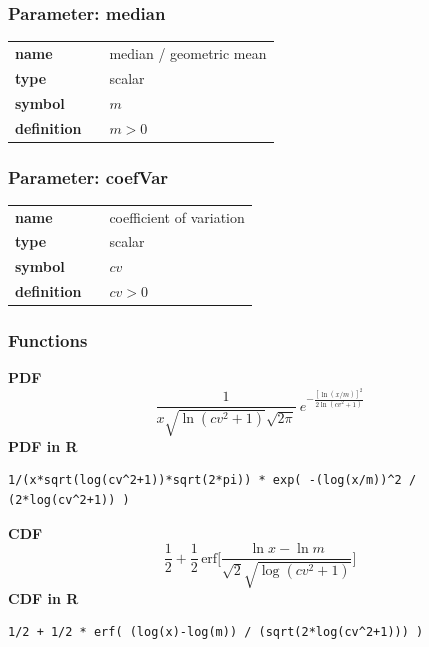 \subsubsection*{Parameter: median}

\noindent\begin{tabular}{p{2cm}cl}
\textbf{name} & & median / geometric mean \\
\textbf{type} & & scalar \\
\textbf{symbol} & & $m$  \\
\textbf{definition} & & $m>0$
\end{tabular}
\subsubsection*{Parameter: coefVar}

\noindent\begin{tabular}{p{2cm}cl}
\textbf{name} & & coefficient of variation \\
\textbf{type} & & scalar \\
\textbf{symbol} & & $cv$  \\
\textbf{definition} & & $cv>0$
\end{tabular}
\subsubsection*{Functions}

\smallskip \noindent \hspace{.2cm} \textbf{PDF} 
\begin{equation*}\frac{1}{x\sqrt{\ln(cv^2+1)}\sqrt{2\pi}}\ e^{-\frac{\left[\ln (x/m)\right]^2}{2\ln(cv^2+1)}}\end{equation*}
\smallskip \noindent \hspace{.2cm} \textbf{PDF in R}  
\begin{verbatim}1/(x*sqrt(log(cv^2+1))*sqrt(2*pi)) * exp( -(log(x/m))^2 / (2*log(cv^2+1)) )\end{verbatim}
\smallskip \noindent \hspace{.2cm} \textbf{CDF} 
\begin{equation*}\frac12 + \frac12\,\text{erf}\Big[\frac{\ln x-\ln m}{\sqrt{2}\sqrt{\log(cv^2+1)}}\Big]\end{equation*}
\smallskip \noindent \hspace{.2cm} \textbf{CDF in R} 
\begin{verbatim}1/2 + 1/2 * erf( (log(x)-log(m)) / (sqrt(2*log(cv^2+1))) )\end{verbatim}
\smallskip
